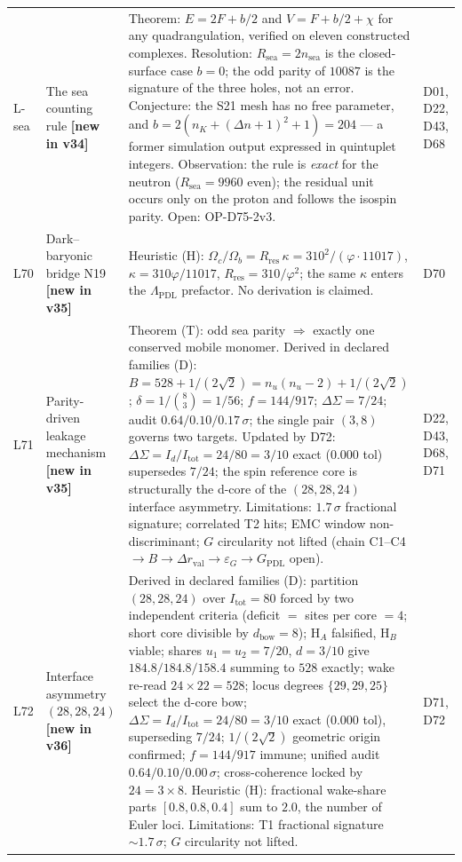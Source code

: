\documentclass[11pt,a4paper]{article}
\newcommand{\Rsea}{R_{\mathrm{sea}}}
\theoremstyle{plain}
\theoremstyle{definition}
\theoremstyle{remark}
\begin{document}
\begin{longtable}{L{0.6cm}L{3.0cm}L{5.5cm}L{4.0cm}}
L-sea & The sea counting rule \textbf{[new in v34]} & \textcolor{proofblue}{Theorem}: $E=2F+b/2$ and $V=F+b/2+\chi$ for any quadrangulation, verified on eleven constructed complexes. \textcolor{proofblue}{Resolution}: $\Rsea=2n_{\mathrm{sea}}$ is the closed-surface case $b=0$; the odd parity of $10087$ is the signature of the three holes, not an error. \textcolor{conjecturegreen}{Conjecture}: the S21 mesh has no free parameter, and $b=2(n_K+(\Delta n+1)^2+1)=204$ --- a former simulation output expressed in quintuplet integers. \textcolor{proofblue}{Observation}: the rule is \emph{exact} for the neutron ($\Rsea=9960$ even); the residual unit occurs only on the proton and follows the isospin parity. Open: OP-D75-2v3. & D01, D22, D43, D68\\[0.3em]
L70 & Dark--baryonic bridge N19 \textbf{[new in v35]} & \textcolor{hypothesisorange}{Heuristic (H)}: $\Omega_{c}/\Omega_{b}=R_{\mathrm{res}}\,\kappa=310^{2}/(\varphi\cdot11017)$, $\kappa=310\varphi/11017$, $R_{\mathrm{res}}=310/\varphi^{2}$; the same $\kappa$ enters the $\Lambda_{\mathrm{PDL}}$ prefactor. No derivation is claimed. & D70\\[0.3em]
L71 & Parity-driven leakage mechanism \textbf{[new in v35]} & \textcolor{proofblue}{Theorem (T)}: odd sea parity $\Rightarrow$ exactly one conserved mobile monomer. \textcolor{proofblue}{Derived in declared families (D)}: $B=528+1/(2\sqrt{2})=n_{u}(n_{u}-2)+1/(2\sqrt{2})$; $\delta=1/\binom{8}{3}=1/56$; $f=144/917$; $\Delta\Sigma=7/24$; audit $0.64/0.10/0.17\,\sigma$; the single pair $(3,8)$ governs two targets. \textcolor{negativered}{Updated by D72}: $\Delta\Sigma=I_{d}/I_{\mathrm{tot}}=24/80=3/10$ exact ($0.000$ tol) supersedes $7/24$; the spin reference core is structurally the d-core of the $(28,28,24)$ interface asymmetry. \textcolor{negativered}{Limitations}: $1.7\,\sigma$ fractional signature; correlated T2 hits; EMC window non-discriminant; $G$ circularity not lifted (chain C1--C4 $\to B\to\Delta r_{\mathrm{val}}\to\varepsilon_{G}\to G_{\mathrm{PDL}}$ open). & D22, D43, D68, D71\\[0.3em]
L72 & Interface asymmetry $(28,28,24)$ \textbf{[new in v36]} & \textcolor{proofblue}{Derived in declared families (D)}: partition $(28,28,24)$ over $I_{\mathrm{tot}}=80$ forced by two independent criteria (deficit $=$ sites per core $=4$; short core divisible by $d_{\mathrm{bow}}=8$); H$_{A}$ falsified, H$_{B}$ viable; shares $u_{1}=u_{2}=7/20$, $d=3/10$ give $184.8/184.8/158.4$ summing to $528$ exactly; wake re-read $24\times22=528$; locus degrees $\{29,29,25\}$ select the d-core bow; $\Delta\Sigma=I_{d}/I_{\mathrm{tot}}=24/80=3/10$ exact ($0.000$ tol), superseding $7/24$; $1/(2\sqrt{2})$ geometric origin confirmed; $f=144/917$ immune; unified audit $0.64/0.10/0.00\,\sigma$; cross-coherence locked by $24=3\times8$. \textcolor{hypothesisorange}{Heuristic (H)}: fractional wake-share parts $[0.8,0.8,0.4]$ sum to $2.0$, the number of Euler loci. \textcolor{negativered}{Limitations}: T1 fractional signature $\sim1.7\,\sigma$; $G$ circularity not lifted. & D71, D72\\[0.3em]

\end{longtable}
\end{document}
